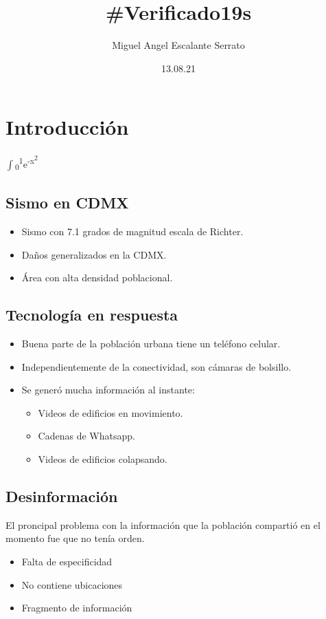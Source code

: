 \documentclass[11pt]{article}
\author{Miguel Angel Escalante Serrato}
\date{13.08.21}
\title{\#Verificado19s}
\begin{document}
\maketitle

\section{Introducción}
\label{sec:org4463394}
\(\int\)\textsubscript{0}\textsuperscript{1}e\textsuperscript{-x\textsuperscript{2}}
\subsection{Sismo en CDMX}
\label{sec:org0e81e26}
\begin{itemize}
\item Sismo con 7.1 grados de magnitud escala de Richter.
\item Daños generalizados en la CDMX.
\item Área con alta densidad poblacional.
\end{itemize}
\subsection{Tecnología en respuesta}
\label{sec:org29d2579}
\begin{itemize}
\item Buena parte de la población urbana tiene un teléfono celular.
\item Independientemente de la conectividad, son cámaras de bolsillo.
\item Se generó mucha información al instante:
\begin{itemize}
\item Videos de edificios en movimiento.
\item Cadenas de Whatsapp.
\item Videos de edificios colapsando.
\end{itemize}
\end{itemize}
\subsection{Desinformación}
\label{sec:org0c3555b}
El proncipal problema con la información que la población compartió en el momento fue que no tenía orden.
\begin{itemize}
\item Falta de especificidad
\item No contiene ubicaciones
\item Fragmento de información
\end{itemize}
\end{document}
